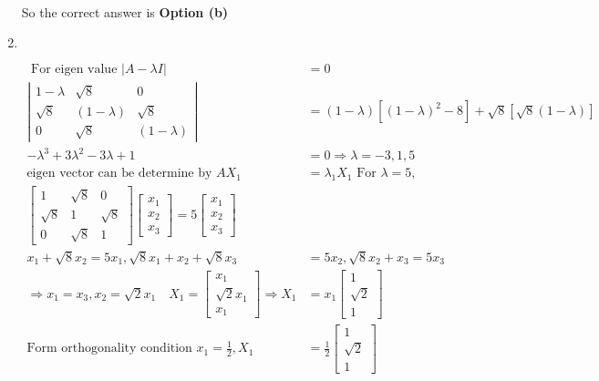 \begin{enumerate}
\begin{answer}
\begin{align*}
		\end{align*}
		So the correct answer is \textbf{Option (b)}
	\end{answer}
	\item $\left. \right. $
	\begin{answer}
		\begin{align*}
	\text{ For eigen value }|A-\lambda I|&=0\\
		\left|\begin{array}{ccc}
		1-\lambda & \sqrt{8} & 0 \\
		\sqrt{8} & (1-\lambda) & \sqrt{8} \\
		0 & \sqrt{8} & (1-\lambda)
		\end{array}\right|&=(1-\lambda)\left[(1-\lambda)^{2}-8\right]+\sqrt{8}[\sqrt{8}(1-\lambda)] \\
		-\lambda^{3}+3 \lambda^{2}-3 \lambda+1&=0 \Rightarrow \lambda=-3,1,5\\
		\text{eigen vector can be determine by }A X_{1}&=\lambda_{1} X_{1}
	\text{	For }\lambda=5,\\
	{\left[\begin{array}{ccc}1 & \sqrt{8} & 0 \\ \sqrt{8} & 1 & \sqrt{8} \\ 0 & \sqrt{8} & 1\end{array}\right]\left[\begin{array}{l}x_{1} \\ x_{2} \\ x_{3}\end{array}\right]=5\left[\begin{array}{l}x_{1} \\ x_{2} \\ x_{3}\end{array}\right] }&\\
	x_{1}+\sqrt{8} x_{2}=5 x_{1}, \sqrt{8} x_{1}+x_{2}+\sqrt{8} x_{3}&=5 x_{2}, \sqrt{8} x_{2}+x_{3}=5 x_{3}\\
	\Rightarrow x_{1}=x_{3}, x_{2}=\sqrt{2} x_{1} \quad X_{1}=\left[\begin{array}{c}x_{1} \\ \sqrt{2} x_{1} \\ x_{1}\end{array}\right] \Rightarrow X_{1}&=x_{1}\left[\begin{array}{c}1 \\ \sqrt{2} \\ 1\end{array}\right]\\
	\text{Form orthogonality condition }x_{1}=\frac{1}{2}, X_{1}&=\frac{1}{2}\left[\begin{array}{c}1 \\ \sqrt{2} \\ 1\end{array}\right]

\end{align*}
\end{answer}
\end{enumerate}
